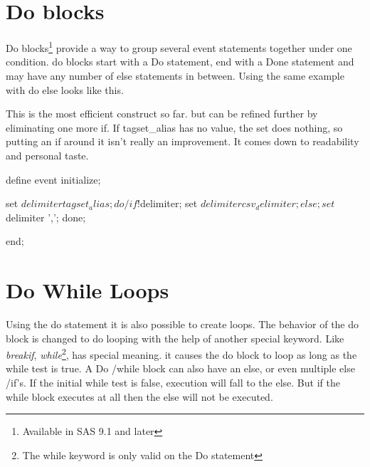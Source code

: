 \section{Do blocks}
Do blocks\footnote{Available in SAS 9.1 and later} provide a way to 
group several event statements together under one condition.  
do blocks start with a Do statement, end with a Done statement and may
have any number of else statements in between.  Using the same example
with do else looks like this.

This is the most efficient construct so far.  but can be refined further by
eliminating one more if.  If tagset\_alias has no value, the set does nothing,
so putting an if around it isn't really an improvement.  It comes down to 
readability and personal taste.

\begin{sfvcode}
        define event initialize;

           set $delimiter tagset_alias;

           do /if !$delimiter;
               set $delimiter csv_delimiter;

           else;
               set $delimiter ',';
           done;

        end;
\end{sfvcode}

\section{Do While Loops}
Using the do statement it is also possible to create loops.  The behavior of the do
block is changed to do looping with  
the help of another special keyword.  Like {\itshape breakif}, 
{\itshape while}\footnote{The while keyword is only valid on the Do statement}, 
has special meaning.
it causes the do block to loop as long as the while test is true.  A Do /while
block can also have an else, or even multiple else /if's.  If the initial while
test is false, execution will fall to the else.  But if the while block executes
at all then the else will not be executed.

